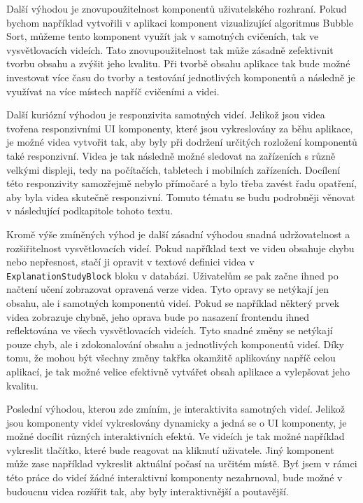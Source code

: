 Další výhodou je znovupoužitelnost komponentů uživatelského rozhraní. Pokud bychom například vytvořili v aplikaci komponent vizualizující algoritmus Bubble Sort, můžeme tento komponent využít jak v samotných cvičeních, tak ve vysvětlovacích videích. Tato znovupoužitelnost tak může zásadně zefektivnit tvorbu obsahu a zvýšit jeho kvalitu. Při tvorbě obsahu aplikace tak bude možné investovat více času do tvorby a testování jednotlivých komponentů a následně je využívat na více místech napříč cvičeními a videi.

Další kuriózní výhodou je responzivita samotných videí. Jelikož jsou videa tvořena responzivními UI komponenty, které jsou vykreslovány za běhu aplikace, je možné videa vytvořit tak, aby byly při dodržení určitých rozložení komponentů také responzivní. Videa je tak následně možné sledovat na zařízeních s různě velkými displeji, tedy na počítačích, tabletech i mobilních zařízeních. Docílení této responzivity samozřejmě nebylo přímočaré a bylo třeba zavést řadu opatření, aby byla videa skutečně responzivní. Tomuto tématu se budu podrobněji věnovat v následující podkapitole tohoto textu.

Kromě výše zmíněných výhod je další zásadní výhodou snadná udržovatelnost a rozšiřitelnost vysvětlovacích videí. Pokud například text ve videu obsahuje chybu nebo nepřesnost, stačí ji opravit v textové definici videa v \texttt{ExplanationStudyBlock} bloku v databázi. Uživatelům se pak začne ihned po načtení učení zobrazovat opravená verze videa. Tyto opravy se netýkají jen obsahu, ale i samotných komponentů videí. Pokud se například některý prvek videa zobrazuje chybně, jeho oprava bude po nasazení frontendu ihned reflektována ve všech vysvětlovacích videích. Tyto snadné změny se netýkají pouze chyb, ale i zdokonalování obsahu a jednotlivých komponentů videí. Díky tomu, že mohou být všechny změny takřka okamžitě aplikovány napříč celou aplikací, je tak možné velice efektivně vytvářet obsah aplikace a vylepšovat jeho kvalitu.

Poslední výhodou, kterou zde zmíním, je interaktivita samotných videí. Jelikož jsou komponenty videí vykreslovány dynamicky a jedná se o UI komponenty, je možné docílit různých interaktivních efektů. Ve videích je tak možné například vykreslit tlačítko, které bude reagovat na kliknutí uživatele. Jiný komponent může zase například vykreslit aktuální počasí na určitém místě. Byť jsem v rámci této práce do videí žádné interaktivní komponenty nezahrnoval, bude možné v budoucnu videa rozšířit tak, aby byly interaktivnější a poutavější.

